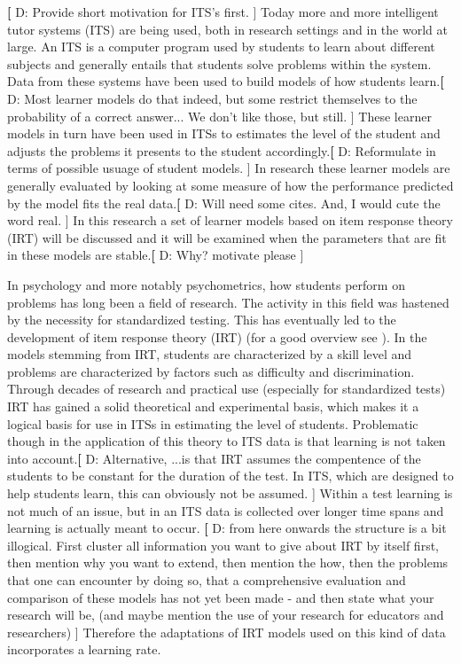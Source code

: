 \documentclass{scrartcl}
\providecommand{\comm}[1]{{\textbf[ #1 ]}}
\providecommand{\commd}[1]{\comm{D: {#1}}}
\begin{document}
\commd{Provide short motivation for ITS's first.} Today more and more intelligent tutor systems (ITS) are being used, both in research settings and in the world at large. An ITS is a computer program used by students to learn about different subjects and generally entails that students solve problems within the system. Data from these systems have been used to build models of how students learn.\commd{Most learner models do that indeed, but some restrict themselves to the probability of a correct answer... We don't like those, but still.} These learner models in turn have been used in ITSs to estimates the level of the student and adjusts the problems it presents to the student accordingly.\commd{Reformulate in terms of possible usuage of student models.} In research these learner models are generally evaluated by looking at some measure of how the performance predicted by the model fits the real data.\commd{Will need some cites. And, I would cute the word real.} In this research a set of learner models based on item response theory (IRT) will be discussed and it will be examined when the parameters that are fit in these models are stable.\commd{Why? motivate please}

In psychology and more notably psychometrics, how students perform on problems has long been a field of research. The activity in this field was hastened by the necessity for standardized testing. This has eventually led to the development of item response theory (IRT) (for a good overview see \cite{hambleton}). In the models stemming from IRT, students are characterized by a skill level and problems are characterized by factors such as difficulty and discrimination. Through decades of research and practical use (especially for standardized tests) IRT has gained a solid theoretical and experimental basis, which makes it a logical basis for use in ITSs in estimating the level of students. Problematic though in the application of this theory to ITS data is that learning is not taken into account.\commd{Alternative, ...is that IRT assumes the compentence of the students to be constant for the duration of the test. In ITS, which are designed to help students learn, this can obviously not be assumed.} Within a test learning is not much of an issue, but in an ITS data is collected over longer time spans and learning is actually meant to occur. \commd{ from here onwards the structure is a bit illogical. First cluster all information you want to give about IRT by itself first, then mention why you want to extend, then mention the how, then the problems that one can encounter by doing so, that a comprehensive evaluation and comparison of these models has not yet been made - and then state what your research will be, (and maybe mention the use of your research for educators and researchers)} Therefore the adaptations of IRT models used on this kind of data incorporates a learning rate.
\end{document}
